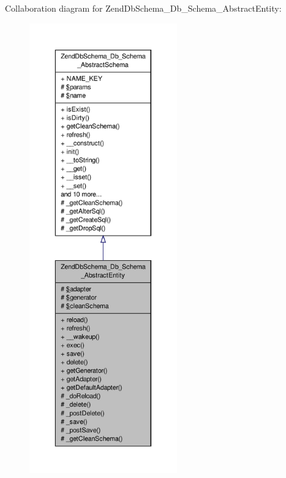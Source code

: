 Collaboration diagram for Zend\-Db\-Schema\-\_\-\-Db\-\_\-\-Schema\-\_\-\-Abstract\-Entity\-:\nopagebreak
\begin{figure}[H]
\begin{center}
\leavevmode
\includegraphics[height=550pt]{classZendDbSchema__Db__Schema__AbstractEntity__coll__graph}
\end{center}
\end{figure}
